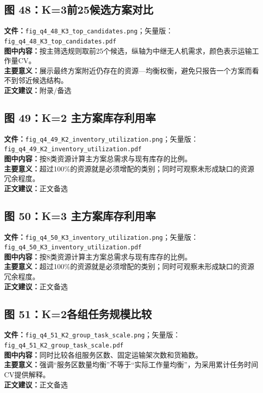 \subsection*{图 48：K=3前25候选方案对比}
\textbf{文件：}\texttt{fig\_q4\_48\_K3\_top\_candidates.png}；矢量版：\texttt{fig\_q4\_48\_K3\_top\_candidates.pdf}\\
\textbf{图中内容：}按主筛选规则取前25个候选，纵轴为中继无人机需求，颜色表示运输工作量CV。\\
\textbf{主要意义：}展示最终方案附近仍存在的资源—均衡权衡，避免只报告一个方案而看不到邻近候选结构。\\
\textbf{正文建议：}附录/备选

\subsection*{图 49：K=2 主方案库存利用率}
\textbf{文件：}\texttt{fig\_q4\_49\_K2\_inventory\_utilization.png}；矢量版：\texttt{fig\_q4\_49\_K2\_inventory\_utilization.pdf}\\
\textbf{图中内容：}按8类资源计算主方案总需求与现有库存的比例。\\
\textbf{主要意义：}超过100\%的资源就是必须增配的类别；同时可观察未形成缺口的资源冗余程度。\\
\textbf{正文建议：}正文备选

\subsection*{图 50：K=3 主方案库存利用率}
\textbf{文件：}\texttt{fig\_q4\_50\_K3\_inventory\_utilization.png}；矢量版：\texttt{fig\_q4\_50\_K3\_inventory\_utilization.pdf}\\
\textbf{图中内容：}按8类资源计算主方案总需求与现有库存的比例。\\
\textbf{主要意义：}超过100\%的资源就是必须增配的类别；同时可观察未形成缺口的资源冗余程度。\\
\textbf{正文建议：}正文备选

\subsection*{图 51：K=2各组任务规模比较}
\textbf{文件：}\texttt{fig\_q4\_51\_K2\_group\_task\_scale.png}；矢量版：\texttt{fig\_q4\_51\_K2\_group\_task\_scale.pdf}\\
\textbf{图中内容：}同时比较各组服务区数、固定运输架次数和货箱数。\\
\textbf{主要意义：}强调“服务区数量均衡”不等于“实际工作量均衡”，为采用累计任务时间CV提供解释。\\
\textbf{正文建议：}正文备选

